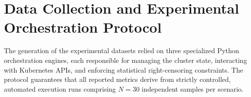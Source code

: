 \section{Data Collection and Experimental Orchestration Protocol}
\label{sec:data-collection-protocol}

The generation of the experimental datasets relied on three specialized Python orchestration engines, each responsible for managing the cluster state, interacting with Kubernetes APIs, and enforcing statistical right-censoring constraints. The protocol guarantees that all reported metrics derive from strictly controlled, automated execution runs comprising $N=30$ independent samples per scenario.



